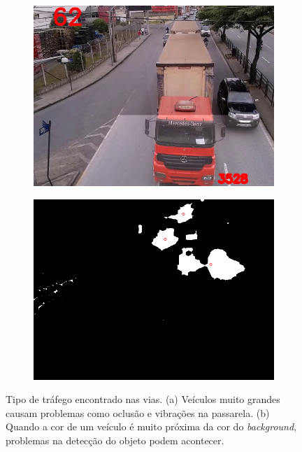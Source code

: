 \begin{figure}[ht]
  \begin{center}
    \begin{subfigure}[b]{.49\textwidth}
      \begin{center}
        \includegraphics[width=1\linewidth]{imgs/veiculo_grande.png}
      \end{center}
      \caption{}
      \label{fig:veiculo_grande}
    \end{subfigure}
    \begin{subfigure}[b]{.49\textwidth}
      \begin{center}
        \includegraphics[width=1\linewidth]{imgs/problema_veiculo_junto.png}
      \end{center}
      \caption{}
      \label{fig:mesma_cor}
    \end{subfigure}
  \end{center}
  \caption{Tipo de tráfego encontrado nas vias. (a) Veículos muito grandes causam problemas como oclusão e vibrações na passarela. (b) Quando a cor de um veículo é muito próxima da cor do \textit{background}, problemas na detecção do objeto podem acontecer. }
  \label{fig:tipo_de_trafego}
\end{figure}

